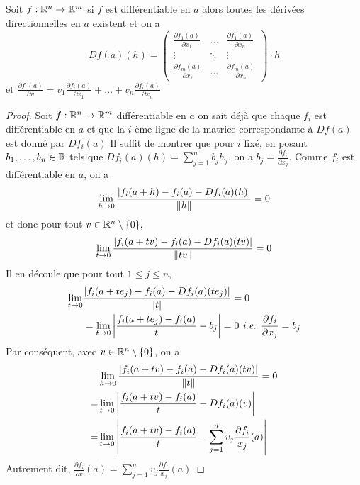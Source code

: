 \begin{theoreme}
Soit $f:\mathbb{R}^n \to \mathbb{R}^m$ si $f$ est différentiable en $a$ alors toutes les dérivées directionnelles en $a$ existent et on a
\begin{equation*}
    Df(a)(h)=
    \begin{pmatrix}
        \frac{\partial f_1(a)}{\partial x_1} & \dots & \frac{\partial f_1(a)}{\partial x_n}\\
        \vdots & \ddots & \vdots\\ 
        \frac{\partial f_m(a)}{\partial x_1} & \dots & \frac{\partial f_m(a)}{\partial x_n}       
    \end{pmatrix}
    \cdot h
\end{equation*}
et $\frac{\partial f_i(a)}{\partial v} = v_1\frac{\partial f_i(a)}{\partial x_1}+\ldots+v_n\frac{\partial f_i(a)}{\partial x_n}$
\end{theoreme}
\begin{proof}
    Soit $f:\mathbb{R}^n\to \mathbb{R}^m$ différentiable en $a$ on sait déjà que chaque $f_i$ est différentiable en $a$ et que la $i$ ème ligne de la matrice correspondante à $Df(a)$ est donné par $Df_i(a)$
    Il suffit de montrer que pour $i$ fixé, en posant $b_1,\dotsc,b_n\in\mathbb{R}$ tels que $Df_i(a)(h)=\sum_{j=1}^nb_jh_j$, on a $b_j= \frac{\partial f_i}{\partial x_j}$.
    Comme $f_i$ est différentiable en $a$, on a 
    \begin{equation*}
        \lim_{h\to 0}\frac{\left| f_i(a+h)-f_i(a)-Df_i(a)(h) \right|}{\left\| h \right\|}=0
    \end{equation*}
    et donc pour tout $v\in \mathbb{R} ^n\setminus\{0\},$ 
    \begin{equation*}
        \lim_{t\to 0}\frac{\left| f_i(a+tv)-f_i(a)-Df_i(a)(tv) \right|}{\left\| tv \right\|}=0
    \end{equation*}   
    Il en découle que pour tout $1\le j\le n$,
    \begin{align*}
         \lim_{t\to 0}&\frac{\left| f_i(a+te_j)-f_i(a)-Df_i(a)(te_j) \right|}{\left| t \right|}=0\\
         &=\lim _{t\to 0}\left| \frac{f_i(a+te_j)-f_i(a)}{t}-b_j \right| =0 \textit{ i.e. } \frac{\partial f_i}{\partial x_j}=b_j
    \end{align*}
    Par conséquent, avec $v\in \mathbb{R}^n\setminus\{0\}$, on a
    \begin{align*}
        &\lim_{h\to 0}\frac{\left| f_i(a+tv)-f_i(a)-Df_i(a)(tv) \right|}{\left\| t \right\|}=0\\
        =& \lim_{t\to 0}\left| \frac{f_i(a+tv)-f_i(a)}{t}-Df_i(a)(v) \right|\\
        =& \lim_{t\to0}\left| \frac{f_i(a+tv)-f_i(a)}{t}-\sum_{j=1}^nv_j\frac{\partial f_i}{x_j}(a) \right|
    \end{align*}
    Autrement dit, $\frac{\partial f_i}{\partial v}(a)=\sum_{j=1}^nv_j\frac{\partial f_i}{x_j}(a)$
\end{proof}
